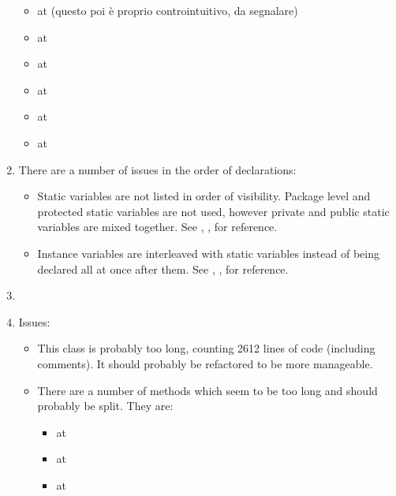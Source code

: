 \begin{enumerate}
\begin{itemize}
		\item {} at  (questo poi è proprio controintuitivo, da segnalare)
		\item {} at 
		\item {} at 
		\item {} at 
		\item {} at 
		\item {} at 
		\end{itemize}
	\item {} There are a number of issues in the order of declarations:
		\begin{itemize}
			\item Static variables are not listed in order of visibility. Package level and protected static variables are not used, however private and public static variables are mixed together. See , ,  for reference.
			\item Instance variables are interleaved with static variables instead of being declared all at once after them. See , ,  for reference. 
		\end{itemize}
	\item {} 
	\item {} Issues:
		\begin{itemize}
			\item This class is probably too long, counting 2612 lines of code (including comments). It should probably be refactored to be more manageable. 
			\item There are a number of methods which seem to be too long and should probably be split. They are:
				\begin{itemize}
				\item {} at 
				\item {} at 
				\item {} at 

\end{itemize}
\end{itemize}
\end{enumerate}
